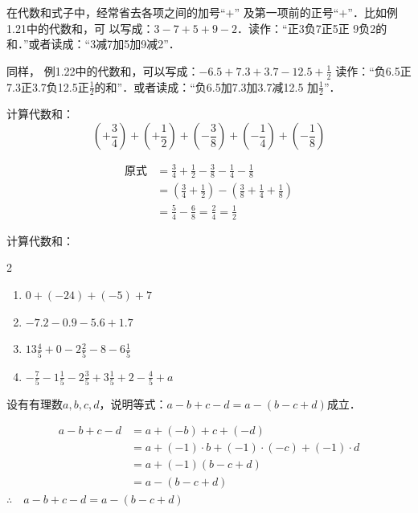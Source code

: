 在代数和式子中，经常省去各项之间的加号“$+$”
及第一项前的正号“$+$”．比如例1.21中的代数和，可
以写成：$3-7+5+9-2$．读作：“正3负7正5正
9负2的和．”或者读成：“3减7加5加9减2”．

同样，
例1.22中的代数和，可以写成：$-6.5+7.3+3.7-12.5+\frac{1}{2}$
读作：“负6.5正7.3正3.7负12.5正$\frac{1}{2}$的和”．或者读成：“负6.5加7.3加3.7减12.5
加$\frac{1}{2}$”．




\begin{example}
 计算代数和：
 \[\left(+\frac{3}{4}\right)+\left(+\frac{1}{2}\right)+\left(-\frac{3}{8}\right)+\left(-\frac{1}{4}\right)+\left(-\frac{1}{8}\right)  \]   
\end{example}


\begin{solution}
      \begin{align*}
    \text{原式}&=\frac{3}{4}+\frac{1}{2}-\frac{3}{8}-\frac{1}{4}-\frac{1}{8}  \tag{简化代数和}\\
    &=\left(\frac{3}{4}+\frac{1}{2}\right)-\left(\frac{3}{8}+\frac{1}{4}+\frac{1}{8}\right)\\
    &=\frac{5}{4}-\frac{6}{8}=\frac{2}{4}=\frac{1}{2}
\end{align*}  
\end{solution}

\begin{ex}
计算代数和：
\begin{multicols}{2}
    \begin{enumerate}%
    \item $0+(-24)+(-5)+7$
    \item $-7.2-0.9-5.6+1.7$
    \item $13\frac{4}{5}+0-2\frac{2}{5}-8-6\frac{1}{5}$
    \item $-\frac{7}{5}-1\frac{1}{5}-2\frac{3}{5}+3\frac{1}{5}+2-\frac{4}{5}+a$
\end{enumerate} 
\end{multicols}

\end{ex}

\begin{example}
    设有有理数$a,b,c,d$，说明等式：$a-b+c-d=a-(b-c+d)$成立．
\end{example}

\begin{solution}
\begin{align*}
    a-b+c-d&= a+(-b)+c+(-d) \tag{代数和原意}\\
    &=a+ (-1)\cdot b+(-1)\cdot (-c)+(-1)\cdot d  \tag{相反数意义}\\
&=a+(-1)(b-c+d) \tag{分配律}\\
&=a-(b-c+d)  \tag{相反数意义}    
\end{align*}    
$\therefore\quad a-b+c-d=a-(b-c+d)$
\end{solution}

